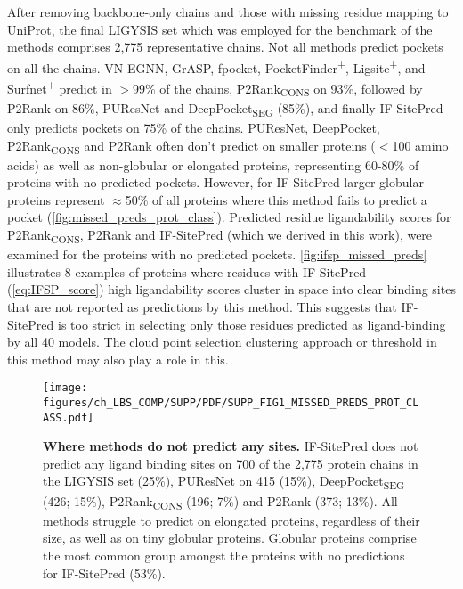 After removing backbone-only chains and those with missing residue mapping to UniProt, the final LIGYSIS set which was employed for the benchmark of the methods comprises 2,775 representative chains. Not all methods predict pockets on all the chains. VN-EGNN, GrASP, fpocket, PocketFinder\textsuperscript{+}, Ligsite\textsuperscript{+}, and Surfnet\textsuperscript{+} predict in $>$99\% of the chains, P2Rank\textsubscript{CONS} on 93\%, followed by P2Rank on 86\%, PUResNet and DeepPocket\textsubscript{SEG} (85\%), and finally IF-SitePred only predicts pockets on 75\% of the chains. PUResNet, DeepPocket, P2Rank\textsubscript{CONS} and P2Rank often don't predict on smaller proteins ($<$100 amino acids) as well as non-globular or elongated proteins, representing 60-80\% of proteins with no predicted pockets. However, for IF-SitePred larger globular proteins represent $\approx$50\% of all proteins where this method fails to predict a pocket (\autoref{fig:missed_preds_prot_class}). Predicted residue ligandability scores for P2Rank\textsubscript{CONS}, P2Rank and IF-SitePred (which we derived in this work), were examined for the proteins with no predicted pockets. \autoref{fig:ifsp_missed_preds} illustrates 8 examples of proteins where residues with IF-SitePred (\autoref{eq:IFSP_score}) high ligandability scores cluster in space into clear binding sites that are not reported as predictions by this method. This suggests that IF-SitePred is too strict in selecting only those residues predicted as ligand-binding by all 40 models. The cloud point selection clustering approach or threshold in this method may also play a role in this.

\begin{figure}[ht!]
    \centering
    \texttt{[image: figures/ch\_LBS\_COMP/SUPP/PDF/SUPP\_FIG1\_MISSED\_PREDS\_PROT\_CLASS.pdf]}
    \caption[Where methods do not predict any sites]{\textbf{Where methods do not predict any sites.} IF-SitePred does not predict any ligand binding sites on 700 of the 2,775 protein chains in the LIGYSIS set (25\%), PUResNet on 415 (15\%), DeepPocket\textsubscript{SEG} (426; 15\%), P2Rank\textsubscript{CONS} (196; 7\%) and P2Rank (373; 13\%). All methods struggle to predict on elongated proteins, regardless of their size, as well as on tiny globular proteins. Globular proteins comprise the most common group amongst the proteins with no predictions for IF-SitePred (53\%).}
    \label{fig:missed_preds_prot_class}
\end{figure}

